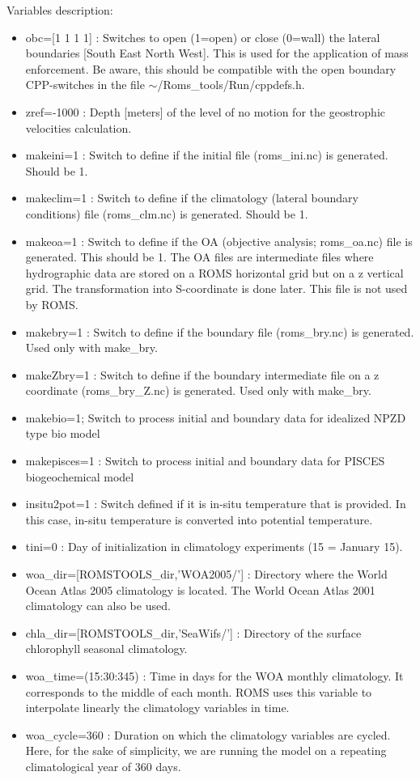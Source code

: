 Variables description:
\begin{itemize}
\item obc=[1 1 1 1] : Switches to open (1=open) or close (0=wall) the lateral
boundaries [South East North West]. This is used for the application of mass
enforcement. Be aware, this should be compatible with the open boundary
CPP-switches in the file $\sim$/Roms\_tools/Run/cppdefs.h.
\item zref=-1000 : Depth [meters] of the level of no motion for the geostrophic 
velocities calculation.
\item makeini=1 : Switch to define if the initial file (roms\_ini.nc) is generated. 
Should be 1.
\item makeclim=1 : Switch to define if the climatology
 (lateral boundary conditions) file (roms\_clm.nc) is generated. Should be 1.
\item makeoa=1 : Switch to define if the OA (objective analysis; roms\_oa.nc)
 file is generated. This should be 1. The OA files are intermediate files
 where hydrographic data are stored on a ROMS horizontal grid but on
 a z vertical grid. The transformation into S-coordinate is done later.
 This file is not used by ROMS.
\item makebry=1 : Switch to define if the boundary file (roms\_bry.nc) is generated.
Used only with make\_bry.
\item makeZbry=1  : Switch to define if the boundary intermediate file on a z coordinate 
 (roms\_bry\_Z.nc) is generated. Used only with make\_bry.
\item makebio=1;      Switch to process initial and boundary data for idealized NPZD type bio model
\item makepisces=1 : Switch to process initial and boundary data for PISCES biogeochemical model
\item insitu2pot=1 : Switch defined if it is in-situ temperature that is provided.
In this case, in-situ temperature is converted into potential temperature.
\item tini=0 : Day of initialization in climatology experiments (15 = January 15).
\item woa\_dir=[ROMSTOOLS\_dir,'WOA2005/'] : Directory where the World Ocean
Atlas 2005 climatology \citep{Con02} is located. The World Ocean
Atlas 2001 climatology can also be used.
\item chla\_dir=[ROMSTOOLS\_dir,'SeaWifs/'] : Directory of the surface 
chlorophyll seasonal climatology.
\item woa\_time=(15:30:345) : Time in days for the WOA monthly climatology. 
It corresponds to the middle of each month. ROMS uses this variable to 
interpolate linearly the climatology variables in time.
\item woa\_cycle=360 : Duration on which the climatology variables are cycled. 
Here, for the sake of simplicity, we are running the model on a repeating climatological 
year of 360 days.
\end{itemize}
